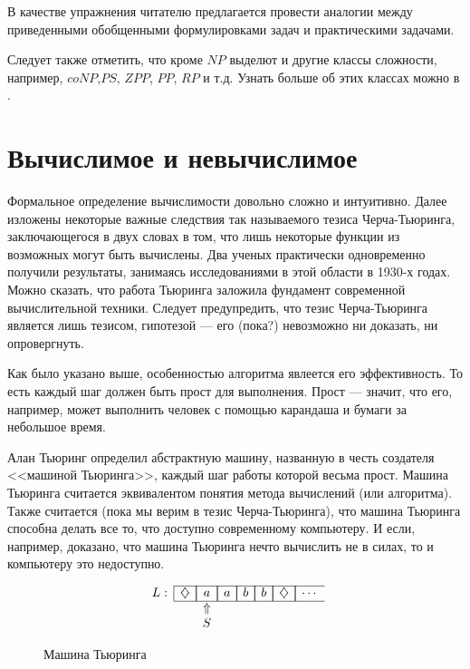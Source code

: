 В качестве упражнения читателю предлагается провести аналогии между приведенными обобщенными формулировками задач и практическими задачами. 

Следует также отметить, что кроме $NP$ выделют и другие классы сложности, например, $coNP$,$PS$, $ZPP$, $PP$, $RP$ и т.д. Узнать больше об этих классах можно в \cite{bib:hopkroft:automateIntro}.


\section{Вычислимое и невычислимое}

Формальное определение вычислимости довольно сложно и интуитивно. Далее изложены некоторые важные следствия так называемого тезиса Черча-Тьюринга, заключающегося в двух словах в том, что лишь некоторые функции из возможных могут быть вычислены. Два ученых практически одновременно получили результаты, занимаясь исследованиями в этой области в 1930-х годах. Можно сказать, что работа Тьюринга заложила фундамент современной вычислительной техники. Следует предупредить, что тезис Черча-Тьюринга является лишь тезисом, гипотезой --- его (пока?) невозможно ни доказать, ни опровергнуть. 

Как было указано выше, особенностью алгоритма явлеется его эффективность. То есть каждый шаг должен быть прост для выполнения. Прост --- значит, что его, например, может выполнить человек с помощью карандаша и бумаги за небольшое время.

Алан Тьюринг определил абстрактную машину, названную в честь создателя <<машиной Тьюринга>>, каждый шаг работы которой весьма прост. Машина Тьюринга считается эквивалентом понятия метода вычислений (или алгоритма). Также считается (пока мы верим в тезис Черча-Тьюринга), что машина Тьюринга способна делать все то, что доступно современному компьютеру. И если, например, доказано, что машина Тьюринга нечто вычислить не в силах, то и компьютеру это недоступно. 

\begin{figure}[!ht]
    \[
        \begin{array}{cccccccc}
            \cline{2-8}
            \multicolumn{1}{r}{L:}
                &\multicolumn{1}{|c|}{\diamondsuit}
                    &\multicolumn{1}{|c|}{a}
                        &\multicolumn{1}{|c|}{a}
                            &\multicolumn{1}{|c|}{b}
                                &\multicolumn{1}{|c|}{b}
                                    &\multicolumn{1}{|c|}{\diamondsuit}
                                        &\multicolumn{1}{|c}{\cdots}
                                            \\ 
            \cline{2-8}
            &&\Uparrow&&&&&\\
            &&S&&&&&
        \end{array}
    \]
    \caption{Машина Тьюринга}
    \label{fig:alg:turingMachine}
\end{figure}

